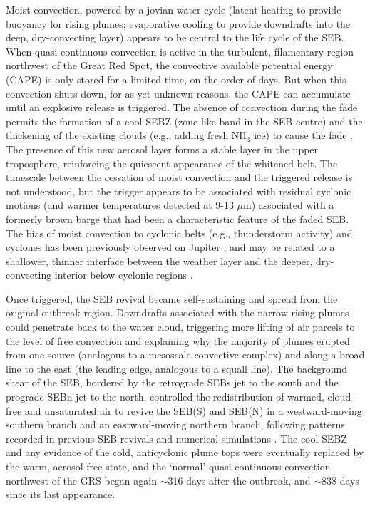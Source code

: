 \documentclass[final,authoryear,5p,times,twocolumn]{elsarticle}
\begin{document}
Moist convection, powered by a jovian water cycle (latent heating to provide buoyancy for rising plumes; evaporative cooling to provide downdrafts into the deep, dry-convecting layer) appears to be central to the life cycle of the SEB.  When quasi-continuous convection is active in the turbulent, filamentary region northwest of the Great Red Spot, the convective available potential energy (CAPE) is only stored for a limited time, on the order of days.  But when this convection shuts down, for as-yet unknown reasons, the CAPE can accumulate until an explosive release is triggered.  The absence of convection during the fade permits the formation of a cool SEBZ (zone-like band in the SEB centre) and the thickening of the existing clouds (e.g., adding fresh NH$_3$ ice) to cause the fade \citep{11fletcher_fade, 12perezhoyos}.  The presence of this new aerosol layer forms a stable layer in the upper troposphere, reinforcing the quiescent appearance of the whitened belt.  The timescale between the cessation of moist convection and the triggered release is not understood, but the trigger appears to be associated with residual cyclonic motions (and warmer temperatures detected at 9-13 $\mu$m) associated with a formerly brown barge that had been a characteristic feature of the faded SEB.  The bias of moist convection to cyclonic belts (e.g., thunderstorm activity) and cyclones has been previously observed on Jupiter \citep{00ingersoll}, and may be related to a shallower, thinner interface between the weather layer and the deeper, dry-convecting interior below cyclonic regions \citep[e.g.,][]{89dowling, 16thomson}.  

Once triggered, the SEB revival became self-sustaining and spread from the original outbreak region.  Downdrafts associated with the narrow rising plumes could penetrate back to the water cloud, triggering more lifting of air parcels to the level of free convection and explaining why the majority of plumes erupted from one source (analogous to a mesoscale convective complex) and along a broad line to the east (the leading edge, analogous to a squall line).  The background shear of the SEB, bordered by the retrograde SEBs jet to the south and the prograde SEBn jet to the north, controlled the redistribution of warmed, cloud-free and unsaturated air to revive the SEB(S) and SEB(N) in a westward-moving southern branch and an eastward-moving northern branch, following patterns recorded in previous SEB revivals \citep{95rogers, 96sanchez} and numerical simulations \citep{02hueso}.  The cool SEBZ and any evidence of the cold, anticyclonic plume tops were eventually replaced by the warm, aerosol-free state, and the `normal' quasi-continuous convection northwest of the GRS began again $\sim316$ days after the outbreak, and $\sim838$ days since its last appearance.  
\end{document}
